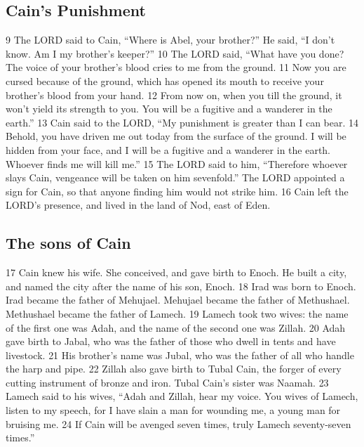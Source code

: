 \hypertarget{cains-punishment}{%
\subsection{Cain's Punishment}\label{cains-punishment}}

{9} The LORD said to Cain, ``Where is Abel, your brother?'' He said, ``I
don't know. Am I my brother's keeper?'' {10} The LORD said, ``What have
you done? The voice of your brother's blood cries to me from the ground.
{11} Now you are cursed because of the ground, which has opened its
mouth to receive your brother's blood from your hand. {12} From now on,
when you till the ground, it won't yield its strength to you. You will
be a fugitive and a wanderer in the earth.'' {13} Cain said to the LORD,
``My punishment is greater than I can bear. {14} Behold, you have driven
me out today from the surface of the ground. I will be hidden from your
face, and I will be a fugitive and a wanderer in the earth. Whoever
finds me will kill me.'' {15} The LORD said to him, ``Therefore whoever
slays Cain, vengeance will be taken on him sevenfold.'' The LORD
appointed a sign for Cain, so that anyone finding him would not strike
him. {16} Cain left the LORD's presence, and lived in the land of Nod,
east of Eden.

\hypertarget{the-sons-of-cain}{%
\subsection{The sons of Cain}\label{the-sons-of-cain}}

{17} Cain knew his wife. She conceived, and gave birth to Enoch. He
built a city, and named the city after the name of his son, Enoch. {18}
Irad was born to Enoch. Irad became the father of Mehujael. Mehujael
became the father of Methushael. Methushael became the father of Lamech.
{19} Lamech took two wives: the name of the first one was Adah, and the
name of the second one was Zillah. {20} Adah gave birth to Jabal, who
was the father of those who dwell in tents and have livestock. {21} His
brother's name was Jubal, who was the father of all who handle the harp
and pipe. {22} Zillah also gave birth to Tubal Cain, the forger of every
cutting instrument of bronze and iron. Tubal Cain's sister was Naamah.
{23} Lamech said to his wives, ``Adah and Zillah, hear my voice. You
wives of Lamech, listen to my speech, for I have slain a man for
wounding me, a young man for bruising me. {24} If Cain will be avenged
seven times, truly Lamech seventy-seven times.''

